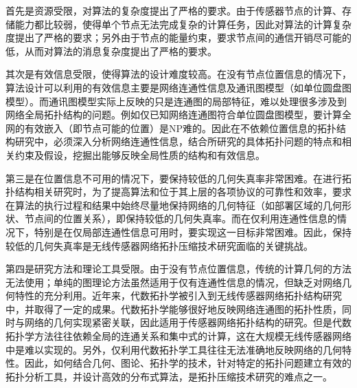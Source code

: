 首先是资源受限，对算法的复杂度提出了严格的要求。由于传感器节点的计算、存储能力都比较弱，使得单个节点无法完成复杂的计算任务，因此对算法的计算复杂度提出了严格的要求；另外由于节点的能量约束，要求节点间的通信开销尽可能的低，从而对算法的消息复杂度提出了严格的要求。

其次是有效信息受限，使得算法的设计难度较高。在没有节点位置信息的情况下，算法设计可以利用的有效信息主要是网络连通性信息及通讯图模型（如单位圆盘图模型）。而通讯图模型实际上反映的只是连通图的局部特征，难以处理很多涉及到网络全局拓扑结构的问题。例如仅已知网络连通图符合单位圆盘图模型，要计算全网的有效嵌入（即节点可能的位置）是NP难的。因此在不依赖位置信息的拓扑结构研究中，必须深入分析网络连通性信息，结合所研究的具体拓扑问题的特点和相关约束及假设，挖掘出能够反映全局性质的结构和有效信息。

第三是在位置信息不可用的情况下，要保持较低的几何失真率非常困难。在进行拓扑结构相关研究时，为了提高算法和位于其上层的各项协议的可靠性和效率，要求在算法的执行过程和结果中始终尽量地保持网络的几何特征（如部署区域的几何形状、节点间的位置关系），即保持较低的几何失真率。而在仅利用连通性信息的情况下，特别是在仅局部连通性信息可用时，要实现这一目标非常困难。因此，保持较低的几何失真率是无线传感器网络拓扑压缩技术研究面临的关键挑战。

第四是研究方法和理论工具受限。由于没有节点位置信息，传统的计算几何的方法无法使用；单纯的图理论方法虽然适用于仅有连通性信息的情况，但缺乏对网络几何特性的充分利用。近年来，代数拓扑学被引入到无线传感器网络拓扑结构研究中，并取得了一定的成果。代数拓扑学能够很好地反映网络连通图的拓扑性质，同时与网络的几何实现紧密关联，因此适用于传感器网络拓扑结构的研究。但是代数拓扑学方法往往依赖全局的连通关系和集中式的计算，这在大规模无线传感器网络中是难以实现的。另外，仅利用代数拓扑学工具往往无法准确地反映网络的几何特性。因此，如何结合几何、图论、拓扑学的技术，针对特定的拓扑问题建立有效的拓扑分析工具，并设计高效的分布式算法，是拓扑压缩技术研究的难点之一。
